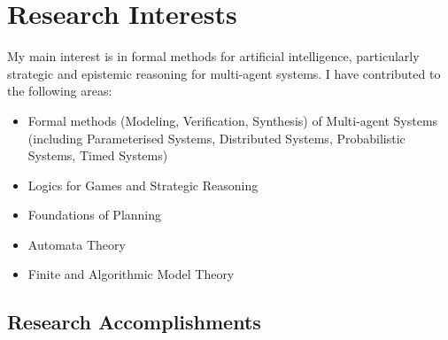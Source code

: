 \documentclass[10pt,a4paper,sans]{moderncv}
\begin{document}
\newpage

\section{Research Interests}
My main interest is in formal methods for artificial intelligence, particularly strategic and epistemic reasoning for multi-agent systems.
I have contributed to the following areas:
\begin{itemize}
 \item Formal methods (Modeling, Verification, Synthesis) of Multi-agent Systems (including Parameterised Systems, Distributed Systems, Probabilistic Systems, Timed Systems)
 \item Logics for Games and Strategic Reasoning
 \item Foundations of Planning
 \item Automata Theory
 \item Finite and Algorithmic Model Theory
\end{itemize}


% 
% 



\subsection{Research Accomplishments} %
\end{document}
